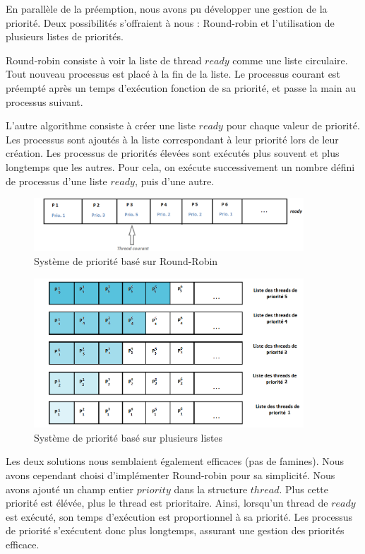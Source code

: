 En parallèle de la préemption, nous avons pu développer une gestion de la priorité. Deux possibilités s'offraient à nous : Round-robin et l'utilisation de plusieurs listes de priorités.

Round-robin consiste à voir la liste de thread $ready$ comme une liste circulaire. Tout nouveau processus est placé à la fin de la liste. Le processus courant est préempté après un temps d'exécution fonction de sa priorité, et passe la main au processus suivant.

L'autre algorithme consiste à créer une liste $ready$ pour chaque valeur de priorité. Les processus sont ajoutés à la liste correspondant à leur priorité lors de leur création. Les processus de priorités élevées sont exécutés plus souvent et plus longtemps que les autres. Pour cela, on exécute successivement un nombre défini de processus d'une liste $ready$, puis d'une autre.

\begin{figure}[!h]
\centering
\includegraphics[width=0.9\textwidth]{round_robin.png}
\caption{Système de priorité basé sur Round-Robin}  
\label{sequence} 
\end{figure} 

\begin{figure}[!h]
\centering
\includegraphics[width=0.9\textwidth]{queus_multi.png}
\caption{Système de priorité basé sur plusieurs listes}  
\label{sequence} 
\end{figure} 


Les deux solutions nous semblaient également efficaces (pas de famines). Nous avons cependant choisi d'implémenter Round-robin pour sa simplicité. Nous avons ajouté un champ entier $priority$ dans la structure $thread$. Plus cette priorité est élévée, plus le thread est prioritaire. Ainsi, lorsqu'un thread de $ready$ est exécuté, son temps d'exécution est proportionnel à sa priorité. Les processus de priorité s'exécutent donc plus longtemps, assurant une gestion des priorités efficace.
